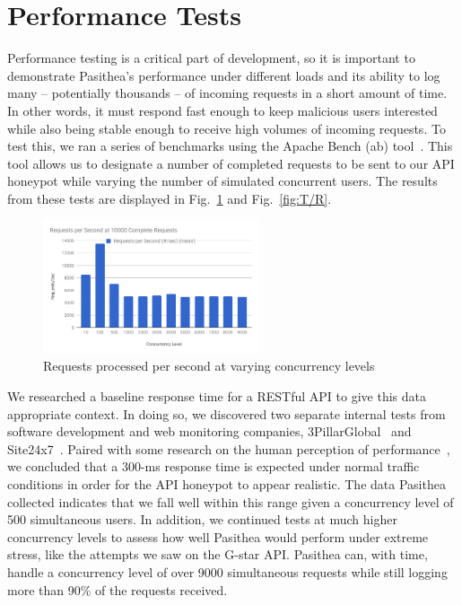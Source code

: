 
\section{Performance Tests} \label{performance}

Performance testing is a critical part of development, so it is important to demonstrate Pasithea's performance under different loads and its ability to log many -- potentially thousands -- of incoming requests in a short amount of time. 
In other words, it must respond fast enough to keep malicious users interested while also being stable enough to receive high volumes of incoming requests. 
To test this, we ran a series of benchmarks using the Apache Bench (ab) tool~\cite{ab}. 
This tool allows us to designate a number of completed requests to be sent to our API honeypot while varying the number of simulated concurrent users. 
The results from these tests are displayed in Fig.~\ref{fig:R/s} and Fig.~\ref{fig:T/R}. 

\begin{figure}[b]
   \centering
   \includegraphics[width=2.5in]{images/RequestsperSecond.png} 
   \caption{Requests processed per second at varying concurrency levels}
   \label{fig:R/s}
\end{figure}

We researched a baseline response time for a RESTful API to give this data appropriate context. 
In doing so, we discovered two separate internal tests from software development and web monitoring companies, 3PillarGlobal~\cite{3Pillar} and Site24x7~\cite{site24x7}. 
Paired with some research on the human perception of performance~\cite{performance}, we concluded that a 300-ms response time is expected under normal traffic conditions in order for the API honeypot to appear realistic. 
The data Pasithea collected indicates that we fall well within this range given a concurrency level of 500 simultaneous users. 
In addition, we continued tests at much higher concurrency levels to assess how well Pasithea would perform under extreme stress, like the attempts we saw on the G-star API. 
Pasithea can, with time, handle a concurrency level of over 9000 simultaneous requests while still logging more than 90\% of the requests received.

